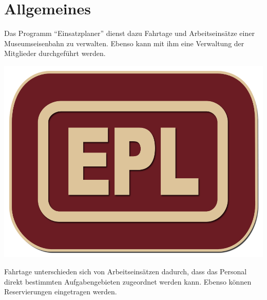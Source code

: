 \chapter{Allgemeines}

Das Programm "`Einsatzplaner"' dienst dazu Fahrtage und Arbeitseinsätze einer Museumseisenbahn zu verwalten.
Ebenso kann mit ihm eine Verwaltung der Mitglieder durchgeführt werden.

\begin{center}
  \includegraphics{../../Icon/keks.png}
\end{center}
%
Fahrtage unterschieden sich von Arbeitseinsätzen dadurch, dass das Personal direkt bestimmten Aufgabengebieten zugeordnet werden kann.
Ebenso können Reservierungen eingetragen werden.
